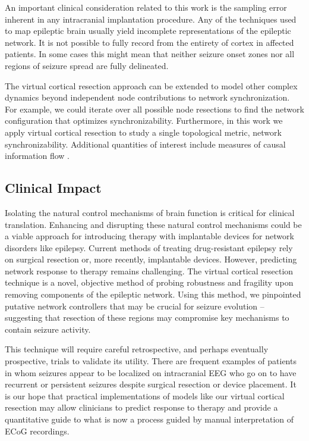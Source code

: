 An important clinical consideration related to this work is the sampling error inherent in any intracranial implantation procedure. Any of the techniques used to map epileptic brain usually yield incomplete representations of the epileptic network. It is not possible to fully record from the entirety of cortex in affected patients. In some cases this might mean that neither seizure onset zones nor all regions of seizure spread are fully delineated.

The virtual cortical resection approach can be extended to model other complex dynamics beyond independent node contributions to network synchronization. For example, we could iterate over all possible node resections to find the network configuration that optimizes synchronizability. Furthermore, in this work we apply virtual cortical resection to study a single topological metric, network synchronizability. Additional quantities of interest include measures of causal information flow \cite{korzeniewska2014ictal}.

\subsection{Clinical Impact}
Isolating the natural control mechanisms of brain function is critical for clinical translation. Enhancing and disrupting these natural control mechanisms could be a viable approach for introducing therapy with implantable devices for network disorders like epilepsy. Current methods of treating drug-resistant epilepsy rely on surgical resection or, more recently, implantable devices. However, predicting network response to therapy remains challenging. The virtual cortical resection technique is a novel, objective method of probing robustness and fragility upon removing components of the epileptic network. Using this method, we pinpointed putative network controllers that may be crucial for seizure evolution -- suggesting that resection of these regions may compromise key mechanisms to contain seizure activity.

This technique will require careful retrospective, and perhaps eventually prospective, trials to validate its utility. There are frequent examples of patients in whom seizures appear to be localized on intracranial EEG who go on to have recurrent or persistent seizures despite surgical resection or device placement. It is our hope that practical implementations of models like our virtual cortical resection may allow clinicians to predict response to therapy and provide a quantitative guide to what is now a process guided by manual interpretation of ECoG recordings. 


